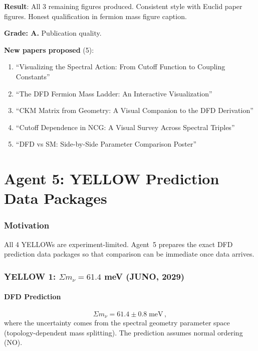 \documentclass[11pt,a4paper]{article}
\begin{document}
\begin{tcolorbox}[colback=green!5!white, colframe=green!60!black, title={Agent 4: 3 $\alpha$ Paper Figures at 100\%}]
\textbf{Result}: All 3 remaining figures produced. Consistent style with Euclid paper figures. Honest qualification in fermion mass figure caption.

\textbf{Grade: A.} Publication quality.

\textbf{New papers proposed} (5):
\begin{enumerate}
\item ``Visualizing the Spectral Action: From Cutoff Function to Coupling Constants''
\item ``The DFD Fermion Mass Ladder: An Interactive Visualization''
\item ``CKM Matrix from Geometry: A Visual Companion to the DFD Derivation''
\item ``Cutoff Dependence in NCG: A Visual Survey Across Spectral Triples''
\item ``DFD vs SM: Side-by-Side Parameter Comparison Poster''
\end{enumerate}
\end{tcolorbox}


\part{Agent 5: YELLOW Prediction Data Packages}
\label{part:yellow-prep}

\section{Motivation}

All 4 YELLOWs are experiment-limited. Agent~5 prepares the exact DFD prediction data packages so that comparison can be immediate once data arrives.

\section{YELLOW 1: $\Sigma m_\nu = 61.4$ meV (JUNO, 2029)}

\subsection{DFD Prediction}
\begin{equation}
\Sigma m_\nu = 61.4 \pm 0.8\;\mathrm{meV}\,,
\end{equation}
where the uncertainty comes from the spectral geometry parameter space (topology-dependent mass splitting). The prediction assumes normal ordering (NO).
\end{document}
